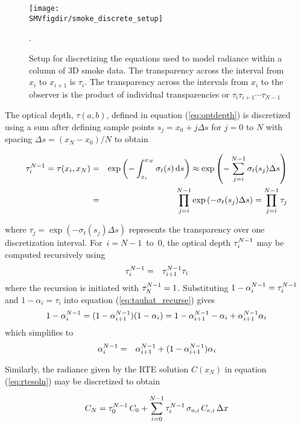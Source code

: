 \documentclass[11pt]{article}
\newcommand{\SMVfigdir}{../../../fig/smv/figures}
\begin{document}
\begin{figure}[bph]
\begin{center}
\texttt{[image: \\SMVfigdir/smoke\_discrete\_setup]}
\end{center}
\caption{Setup for discretizing
the equations used to model radiance within a column of 3D smoke
data. The transparency across the interval from $x_i$ to $x_{i+1}$
is $\tau_i$. The transparency across the intervals from $x_i$ to
the observer is the product of individual transparencies or
$\tau_i\tau_{i+1}\cdots\tau_{N-1}$}.
\label{fig:smokediscretesetup}
\end{figure}

The optical depth, $\tau(a,b)$, defined in equation (\ref{eq:optdepth}) is
discretized using a sum  after defining sample points
$s_j=x_0+j\Delta s$ for $j=0$ to $N$ with spacing $\Delta
s=(x_N-x_0)/N$ to obtain

\begin{eqnarray}
\tau_{i}^{N-1}=\tau(x_i,x_N)&=&\exp\left(-\int_{x_i}^{x_N}\sigma_t(s)\,\mbox{d}s\right)\approx\exp\left(-\sum_{j=i}^{N-1}\sigma_t(s_j)\Delta s\right)\\
&=&\prod_{j=i}^{N-1}\exp\left(-\sigma_t(s_j)\Delta s\right)=\prod_{j=i}^{N-1}\tau_j
\end{eqnarray}

\noindent where $\tau_j=\exp\left(-\sigma_t(s_j)\Delta s\right)$
represents the transparency over one discretization interval.
For~$i=N-1$~to~$0$, the optical depth $\tau_{i}^{N-1}$ may be computed
recursively using
\begin{eqnarray}
\label{eq:tauhat_recurse}
\tau_{i}^{N-1}&=&\tau_{i+1}^{N-1}\tau_i
\end{eqnarray}
\noindent where the recursion is initiated with $\tau_{N}^{N-1}=1$.
Substituting $1-\alpha_{i}^{N-1}=\tau_{i}^{N-1}$ and $1-\alpha_i=\tau_i$ into
equation (\ref{eq:tauhat_recurse}) gives
\begin{eqnarray}
1-\alpha_{i}^{N-1}=(1-\alpha_{i+1}^{N-1})(1-\alpha_i)=1-\alpha_{i+1}^{N-1} - \alpha_i + \alpha_{i+1}^{N-1}\alpha_i
\end{eqnarray}
which simplifies to
\begin{eqnarray}
\label{eq:alpha2}
\alpha_{i}^{N-1}&=&\alpha_{i+1}^{N-1} + (1-\alpha_{i+1}^{N-1})\alpha_i
\end{eqnarray}

Similarly, the radiance given by the RTE solution $C(x_N)$ in
equation (\ref{eq:rtesoln}) may be discretized to obtain

\begin{equation}
C_{N} = \tau_{0}^{N-1}\,C_0 +
\sum_{i=0}^{N-1}\tau_{i}^{N-1}\,\sigma_{a,i}\,C_{e,i}\,\Delta x
\label{eq:discrete_rte2}
\end{equation}
\end{document}
